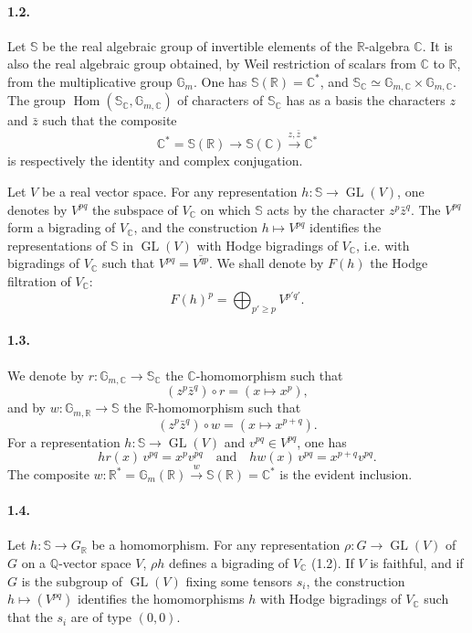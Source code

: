 \documentclass[10pt]{article}
\newcommand{\C}{\mathbb C}
\newcommand{\Gm}{\mathbb G_m}
\newcommand{\Q}{\mathbb Q}
\newcommand{\R}{\mathbb R}
\newcommand{\bS}{\mathbb S}
\newcommand{\GL}{\operatorname{GL}}
\newcommand{\Hom}{\operatorname{Hom}}
\begin{document}
\paragraph{1.2.} Let $\bS$ be the real algebraic group of invertible elements of the $\R$-algebra $\C$. It is also the real algebraic group obtained, by Weil restriction of scalars from $\C$ to $\R$, from the multiplicative group $\Gm$. One has $\bS(\R)=\C^*$, and $\bS_\C\simeq\mathbb G_{m,\C}\times\mathbb G_{m,\C}$. The group $\Hom(\bS_\C,\mathbb G_{m,\C})$ of characters of $\bS_\C$ has as a basis the characters $z$ and $\bar z$ such that the composite
\[
\C^*=\bS(\R)\longrightarrow \bS(\C)\xrightarrow{z,\bar z}\C^*
\]
is respectively the identity and complex conjugation.

Let $V$ be a real vector space. For any representation $h:\bS\to\GL(V)$, one denotes by $V^{pq}$ the subspace of $V_\C$ on which $\bS$ acts by the character $z^p\bar z^q$. The $V^{pq}$ form a bigrading of $V_\C$, and the construction $h\mapsto V^{pq}$ identifies the representations of $\bS$ in $\GL(V)$ with Hodge bigradings of $V_\C$, i.e. with bigradings of $V_\C$ such that $V^{pq}=\overline{V^{qp}}$. We shall denote by $F(h)$ the Hodge filtration of $V_\C$:
\[
F(h)^p=\bigoplus_{p'\ge p}V^{p'q'}.
\]

\paragraph{1.3.} We denote by $r:\mathbb G_{m,\C}\to\bS_\C$ the $\C$-homomorphism such that
\[
(z^p\bar z^q)\circ r=(x\longmapsto x^p),
\]
and by $w:\mathbb G_{m,\R}\to\bS$ the $\R$-homomorphism such that
\[
(z^p\bar z^q)\circ w=(x\longmapsto x^{p+q}).
\]
For a representation $h:\bS\to\GL(V)$ and $v^{pq}\in V^{pq}$, one has
\[
hr(x)\,v^{pq}=x^p v^{pq}\quad\text{and}\quad hw(x)\,v^{pq}=x^{p+q}v^{pq}.
\]
The composite $w:\R^*=\mathbb G_m(\R)\xrightarrow{w}\bS(\R)=\C^*$ is the evident inclusion.

\paragraph{1.4.} Let $h:\bS\to G_\R$ be a homomorphism. For any representation $\rho:G\to\GL(V)$ of $G$ on a $\Q$-vector space $V$, $\rho h$ defines a bigrading of $V_\C$ (1.2). If $V$ is faithful, and if $G$ is the subgroup of $\GL(V)$ fixing some tensors $s_i$, the construction $h\mapsto(V^{pq})$ identifies the homomorphisms $h$ with Hodge bigradings of $V_\C$ such that the $s_i$ are of type $(0,0)$.
\end{document}
